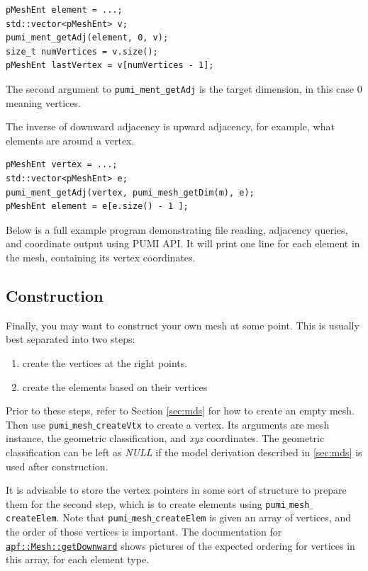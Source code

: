 \documentclass{article}
\begin{document}
{\begin{lstlisting}
pMeshEnt element = ...;
std::vector<pMeshEnt> v;
pumi_ment_getAdj(element, 0, v);
size_t numVertices = v.size();
pMeshEnt lastVertex = v[numVertices - 1];
\end{lstlisting}

The second argument to {\texttt{pumi\_ment\_getAdj}}
is the target dimension, in this case 0 meaning vertices.

The inverse of downward adjacency is upward adjacency,
for example, what elements are around a vertex.

\begin{lstlisting}
pMeshEnt vertex = ...;
std::vector<pMeshEnt> e;
pumi_ment_getAdj(vertex, pumi_mesh_getDim(m), e);
pMeshEnt element = e[e.size() - 1 ];
\end{lstlisting}

Below is a full example program demonstrating file reading,
adjacency queries, and coordinate output using PUMI API.
It will print one line for each element in the mesh,
containing its vertex coordinates.



\subsection{Construction}
\label{sec:gen}

Finally, you may want to construct your own mesh at
some point.
This is usually best separated into two steps:
\begin{enumerate}
\item create the vertices at the right points.
\item create the elements based on their vertices
\end{enumerate}

Prior to these steps, refer to Section \ref{sec:mds} for
how to create an empty mesh.
Then use \texttt{pumi$\_$mesh$\_$createVtx} to create a vertex.
Its arguments are mesh instance, the geometric classification, and \emph{xyz}
coordinates.
The geometric classification can be left as \emph{NULL} if the model derivation
described in \ref{sec:mds} is used after construction.

It is advisable to store the vertex pointers in some sort
of structure to prepare them for the second step,
which is to create elements using \texttt{pumi$\_$mesh$\_$createElem}.
Note that \texttt{pumi$\_$mesh$\_$createElem} is given an array
of vertices, and the order of those vertices is important.
The documentation for
\href{http://scorec.rpi.edu/~dibanez/core/classapf_1_1Mesh.html#ae9af2075129ffd4553092049d85b276b}{\texttt{apf::Mesh::getDownward}}
shows pictures of the expected ordering for vertices
in this array, for each element type.

}
\end{document}
